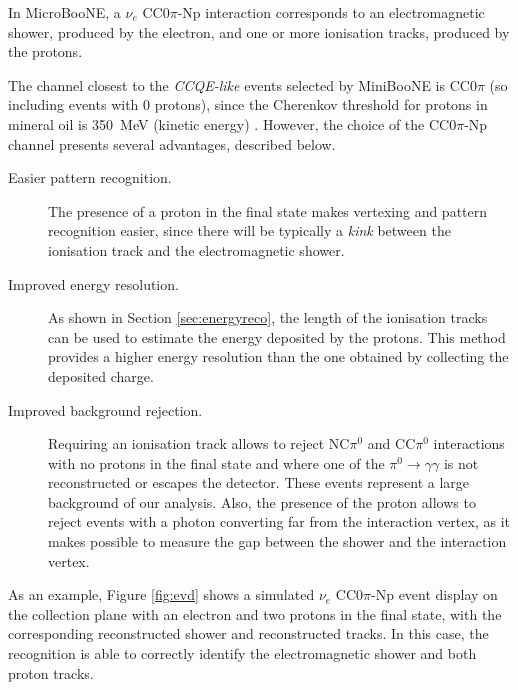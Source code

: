 In MicroBooNE, a $\nu_{e}$ CC0$\pi$-Np interaction corresponds to an electromagnetic shower, produced by the electron, and one or more ionisation tracks, produced by the protons.

The channel closest to the \emph{CCQE-like} events selected by MiniBooNE is CC0$\pi$ (so including events with 0 protons), since the Cherenkov threshold for protons in mineral oil is 350~MeV (kinetic energy) \cite{Perevalov:2009mn}.
However, the choice of the CC0$\pi$-Np channel presents several advantages, described below.
\begin{description}
    \item[Easier pattern recognition.] The presence of a proton in the final state makes vertexing and pattern recognition easier, since there will be typically a \emph{kink} between the ionisation track and the electromagnetic shower.
    \item[Improved energy resolution.] As shown in Section \ref{sec:energyreco}, the length of the ionisation tracks can be used to estimate the energy deposited by the protons. This method provides a higher energy resolution than the one obtained by collecting the deposited charge.
    \item[Improved background rejection.] Requiring an ionisation track allows to reject NC$\pi^0$ and CC$\pi^0$ interactions with no protons in the final state and where one of the $\pi^0\rightarrow\gamma\gamma$ is not reconstructed or escapes the detector. These events represent a large background of our analysis. Also, the presence of the proton allows to reject events with a photon converting far from the interaction vertex, as it makes possible to measure the gap between the shower and the interaction vertex.
\end{description}


As an example, Figure \ref{fig:evd} shows a simulated $\nu_{e}$ CC0$\pi$-Np event display on the collection plane with an electron and two protons in the final state, with the corresponding reconstructed shower and reconstructed tracks. In this case, the  recognition is able to correctly identify the electromagnetic shower and both proton tracks.

